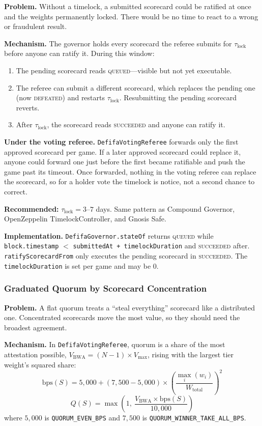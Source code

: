 \documentclass[11pt,a4paper]{article}
\begin{document}
\textbf{Problem.} Without a timelock, a submitted scorecard could be ratified at once and the weights permanently locked. There would be no time to react to a wrong or fraudulent result.

\textbf{Mechanism.} The governor holds every scorecard the referee submits for $\tau_{\text{lock}}$ before anyone can ratify it. During this window:
\begin{enumerate}[nosep]
\item The pending scorecard reads \textsc{queued}---visible but not yet executable.
\item The referee can submit a different scorecard, which replaces the pending one (now \textsc{defeated}) and restarts $\tau_{\text{lock}}$. Resubmitting the pending scorecard reverts.
\item After $\tau_{\text{lock}}$, the scorecard reads \textsc{succeeded} and anyone can ratify it.
\end{enumerate}

\textbf{Under the voting referee.} \texttt{DefifaVotingReferee} forwards only the first approved scorecard per game. If a later approved scorecard could replace it, anyone could forward one just before the first became ratifiable and push the game past its timeout. Once forwarded, nothing in the voting referee can replace the scorecard, so for a holder vote the timelock is notice, not a second chance to correct.

\textbf{Recommended:} $\tau_{\text{lock}} = 3$--$7$ days. Same pattern as Compound Governor, OpenZeppelin TimelockController, and Gnosis Safe.

\textbf{Implementation.} \texttt{DefifaGovernor.stateOf} returns \textsc{queued} while \texttt{block.timestamp} $<$ \texttt{submittedAt + timelockDuration} and \textsc{succeeded} after. \texttt{ratifyScorecardFrom} only executes the pending scorecard in \textsc{succeeded}. The \texttt{timelockDuration} is set per game and may be 0.

\subsubsection{Graduated Quorum by Scorecard Concentration}

\textbf{Problem.} A flat quorum treats a ``steal everything'' scorecard like a distributed one. Concentrated scorecards move the most value, so they should need the broadest agreement.

\textbf{Mechanism.} In \texttt{DefifaVotingReferee}, quorum is a share of the most attestation possible, $V_{\text{BWA}} = (N-1) \times V_{\text{max}}$, rising with the largest tier weight's squared share:
\begin{equation}
\text{bps}(S) = 5{,}000 + (7{,}500 - 5{,}000) \times \left(\frac{\max_i(w_i)}{W_{\text{total}}}\right)^2
\end{equation}
\begin{equation}
Q(S) = \max\left(1,\ \frac{V_{\text{BWA}} \times \text{bps}(S)}{10{,}000}\right)
\end{equation}
where $5{,}000$ is \texttt{QUORUM\_EVEN\_BPS} and $7{,}500$ is \texttt{QUORUM\_WINNER\_TAKE\_ALL\_BPS}.
\end{document}
